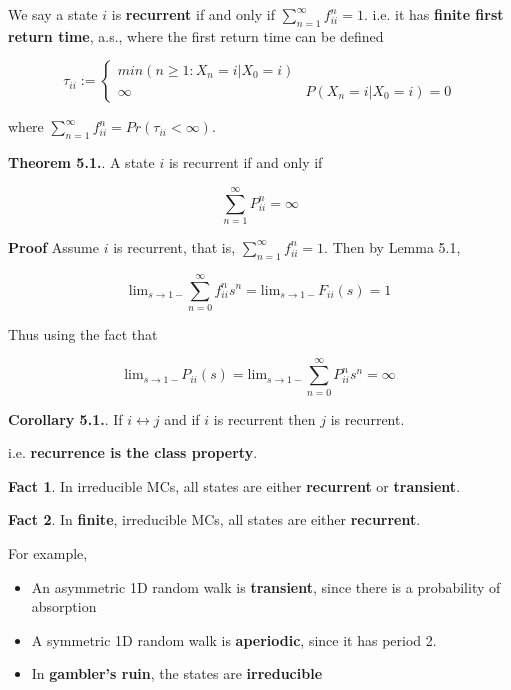 \documentclass[12pt]{article}
\theoremstyle{nonumberbreak}
\begin{document}
We say a state $i$ is \textbf{recurrent} if and only if $\sum_{n=1}^\infty f_{ii}^n = 1$. i.e. it has \textbf{finite first return time}, a.s., where the first return time can be defined 

$$
\tau_{ii} := \begin{cases} min(n \ge 1 : X_n = i | X_0 =i) \\ \infty & P( X_n = i | X_0 =i) = 0 \end{cases}
$$

where $\sum_{n=1}^\infty f_{ii}^n = Pr(\tau_{ii} < \infty)$. 



\begin{theorem}
\textbf{Theorem 5.1.}. A state $i$ is recurrent if and only if 

$$
\sum_{n=1}^\infty P_{ii}^n = \infty
$$
\end{theorem}


\textbf{Proof} Assume $i$ is recurrent, that is, $\sum_{n=1}^\infty f_{ii}^n = 1$. Then by Lemma 5.1,

$$
\mathrm{lim}_{s \to 1-} \sum_{n=0}^\infty f_{ii}^n s^n = \mathrm{lim}_{s \to 1-} F_{ii}(s) = 1
$$

Thus using the fact that 

$$
\mathrm{lim}_{s \to 1-} P_{ii}(s) = \mathrm{lim}_{s \to 1-} \sum_{n=0}^\infty P_{ii}^n s^n = \infty
$$


\begin{theorem}
\textbf{Corollary 5.1.}. If $i \leftrightarrow j$ and if $i$ is recurrent then $j$ is recurrent.
\end{theorem}

i.e. \textbf{recurrence is the class property}.



\begin{theorem}
\textbf{Fact 1}. In irreducible MCs, all states are either \textbf{recurrent} or \textbf{transient}. 

\textbf{Fact 2}. In \textbf{finite}, irreducible MCs, all states are either \textbf{recurrent}. 
\end{theorem}

For example, 

\begin{itemize}
	\item An asymmetric 1D random walk is \textbf{transient}, since there is a probability of absorption 
	\item A symmetric 1D random walk is \textbf{aperiodic}, since it has period 2.
	\item In \textbf{gambler's ruin}, the states are \textbf{irreducible}
\end{itemize}
\end{document}
